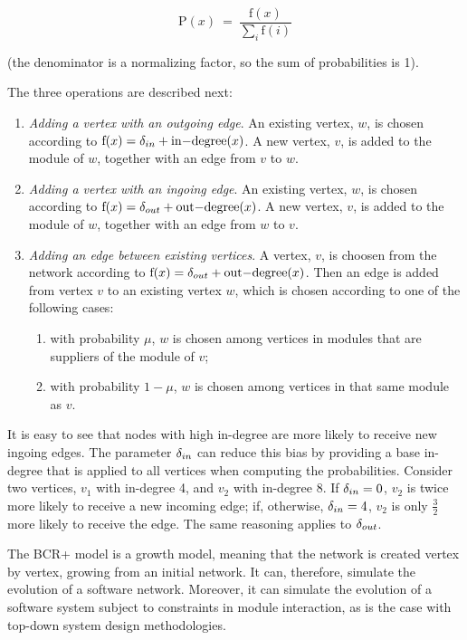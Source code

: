 $$
  \mathrm{P}(x) ~=~ \frac{ \mathrm{f}(x) }
  { \displaystyle\sum_{i} \mathrm{f}(i) }
$$

(the denominator is a normalizing factor, so the sum of probabilities is 1).

The three operations are described next:

\begin{enumerate}

\item \emph{Adding a vertex with an outgoing edge}. An existing vertex, $w$, is
chosen according to $\mathrm{f}(x) = \delta_{in} + \mathrm{in\relax{-}degree}(x)$. A new
vertex, $v$, is added to the module of $w$, together with an edge from $v$ to
$w$.

\item \emph{Adding a vertex with an ingoing edge}. An existing vertex, $w$, is
chosen according to $\mathrm{f}(x) = \delta_{out} + \mathrm{out\relax{-}degree}(x)$. A
new vertex, $v$, is added to the module of $w$, together with an edge from $w$
to $v$.

\item \emph{Adding an edge between existing vertices}. A vertex, $v$, is choosen
from the network according to $\mathrm{f}(x) = \delta_{out} +
\mathrm{out\relax{-}degree}(x)$.  Then an edge is added from vertex $v$ to an
existing vertex $w$, which is chosen according to one of the following cases:

\begin{enumerate}
  \item with probability $\mu$, $w$ is chosen among vertices in modules that are
  suppliers of the module of $v$;
  \item with probability $1 - \mu$, $w$ is chosen among vertices in that same
  module as $v$.
\end{enumerate}

\end{enumerate}

It is easy to see that nodes with high in-degree are more likely to receive new
ingoing edges. The parameter $\delta_{in}$ can reduce this bias by providing a base
in-degree that is applied to all vertices when computing the probabilities.
Consider two vertices, $v_1$ with in-degree 4, and $v_2$ with in-degree 8. If
$\delta_{in} = 0$, $v_2$ is twice more likely to receive a new incoming edge; if,
otherwise, $\delta_{in} = 4$, $v_2$ is only $\frac{3}{2}$ more likely to receive the
edge. The same reasoning applies to $\delta_{out}$.

The BCR+ model is a growth model, meaning that the network is created vertex by
vertex, growing from an initial network. It can, therefore, simulate the
evolution of a software network. Moreover, it can simulate the evolution of a
software system subject to constraints in module interaction, as is the case
with top-down system design methodologies.

